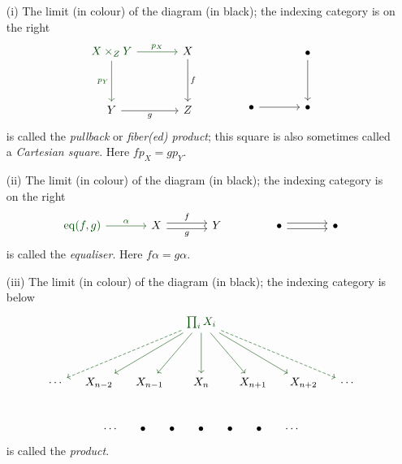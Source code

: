 \begin{example}\label{splimex}\hfill
\begin{itemize}
\item[(i)] The limit (in colour) of the diagram (in black); the indexing category is on the right 
\[\begin{tikzcd}[row sep=huge, column sep = large]
{\color{darkgreen}X\times_Z Y} \arrow[d, "p_Y"',darkgreen] \arrow[r, "p_X",darkgreen] & X \arrow[d, "f"] \\
Y \arrow[r, "g"']                                              & Z               
\end{tikzcd} \qquad\qquad \begin{tikzcd}[row sep=huge, column sep = large]
 & \bullet \arrow[d] \\
\bullet \arrow[r]                                              & \bullet               
\end{tikzcd}\]
is called the \emph{pullback} or \emph{fiber(ed) product}; this square is also sometimes called a \emph{Cartesian square}. Here $fp_X = gp_Y$.

\item[(ii)] The limit (in colour) of the diagram (in black); the indexing category is on the right  
\[\begin{tikzcd}[column sep=large]
{\color{darkgreen}\mathrm{eq}(f,g)} \arrow[r, "\alpha",darkgreen] & X \arrow[r, "f", shift left] \arrow[r, "g"', shift right] & Y
\end{tikzcd}
\qquad\qquad
\begin{tikzcd}[column sep=large]
\bullet \arrow[r, shift left] \arrow[r, shift right] & \bullet
\end{tikzcd}\]
is called the \emph{equaliser}. Here $f\alpha = g\alpha$.

\item[(iii)] The limit (in colour) of the diagram (in black); the indexing category is below
\[\begin{tikzcd}[row sep=huge, column sep=small]
       &         &         & {\color{darkgreen}\prod_iX_i} \arrow[ld,darkgreen] \arrow[d,darkgreen] \arrow[rd,darkgreen] \arrow[rrd,darkgreen] \arrow[lld,darkgreen] \arrow[rrrd, dashed,darkgreen] \arrow[llld, dashed,darkgreen] &         &         &        \\
\cdots & X_{n-2} & X_{n-1} & X_{n}                                                                                                               & X_{n+1} & X_{n+2} & \cdots
\end{tikzcd}\]\\[-0.5em]
\[\begin{tikzcd}[row sep=huge, column sep=small]
\cdots & \bullet & \bullet & \bullet & \bullet & \bullet & \cdots
\end{tikzcd}\]
is called the \emph{product}.


\end{itemize}
\end{example}
